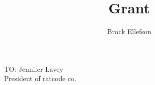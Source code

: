 \documentclass[10pt,a4paper]{article}
\author{Brock Ellefson}
\title{Grant}
\begin{document}
TO: \tab Jennifer Lavey\\
\tab President of ratcode co.
\end{document}
